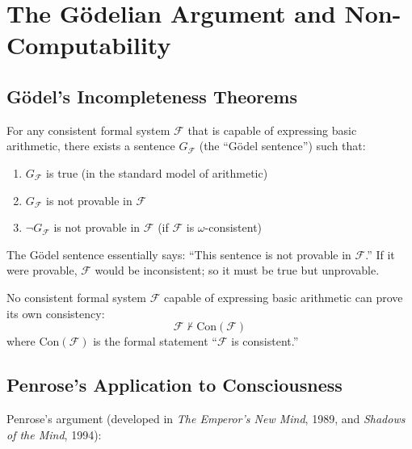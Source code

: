 \documentclass[11pt,a4paper]{report}
\begin{document}
\chapter{The G\"odelian Argument and Non-Computability}

\section{G\"odel's Incompleteness Theorems}

\begin{definitionbox}
For any consistent formal system $\mathcal{F}$ that is capable of expressing basic arithmetic, there exists a sentence $G_\mathcal{F}$ (the ``G\"odel sentence'') such that:
\begin{enumerate}[leftmargin=1.5em]
  \item $G_\mathcal{F}$ is true (in the standard model of arithmetic)
  \item $G_\mathcal{F}$ is not provable in $\mathcal{F}$
  \item $\neg G_\mathcal{F}$ is not provable in $\mathcal{F}$ (if $\mathcal{F}$ is $\omega$-consistent)
\end{enumerate}
The G\"odel sentence essentially says: ``This sentence is not provable in $\mathcal{F}$.'' If it were provable, $\mathcal{F}$ would be inconsistent; so it must be true but unprovable.
\end{definitionbox}

\begin{definitionbox}
No consistent formal system $\mathcal{F}$ capable of expressing basic arithmetic can prove its own consistency:
\[
  \mathcal{F} \nvdash \text{Con}(\mathcal{F})
\]
where $\text{Con}(\mathcal{F})$ is the formal statement ``$\mathcal{F}$ is consistent.''
\end{definitionbox}

\section{Penrose's Application to Consciousness}

Penrose's argument (developed in \textit{The Emperor's New Mind}, 1989, and \textit{Shadows of the Mind}, 1994):
\end{document}

